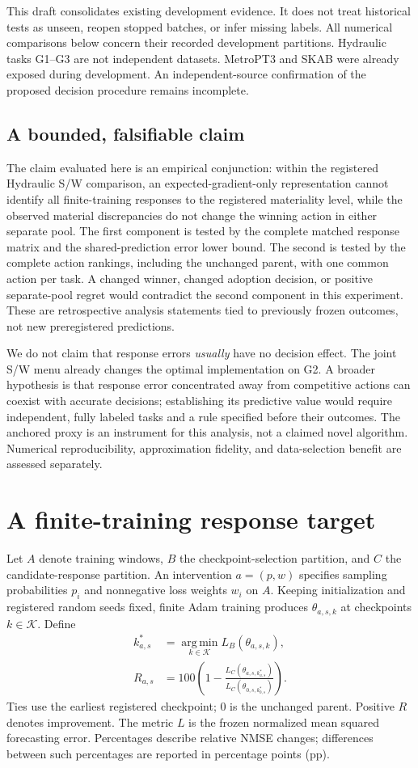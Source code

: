\documentclass[11pt]{article}
\begin{document}
This draft consolidates existing development evidence. It does not treat historical tests as unseen, reopen stopped batches, or infer missing labels. All numerical comparisons below concern their recorded development partitions. Hydraulic tasks G1--G3 are not independent datasets. MetroPT3 and SKAB were already exposed during development. An independent-source confirmation of the proposed decision procedure remains incomplete.

\subsection{A bounded, falsifiable claim}
The claim evaluated here is an empirical conjunction: within the registered Hydraulic S/W comparison, an expected-gradient-only representation cannot identify all finite-training responses to the registered materiality level, while the observed material discrepancies do not change the winning action in either separate pool. The first component is tested by the complete matched response matrix and the shared-prediction error lower bound. The second is tested by the complete action rankings, including the unchanged parent, with one common action per task. A changed winner, changed adoption decision, or positive separate-pool regret would contradict the second component in this experiment. These are retrospective analysis statements tied to previously frozen outcomes, not new preregistered predictions.

We do not claim that response errors \emph{usually} have no decision effect. The joint S/W menu already changes the optimal implementation on G2. A broader hypothesis is that response error concentrated away from competitive actions can coexist with accurate decisions; establishing its predictive value would require independent, fully labeled tasks and a rule specified before their outcomes. The anchored proxy is an instrument for this analysis, not a claimed novel algorithm. Numerical reproducibility, approximation fidelity, and data-selection benefit are assessed separately.

\section{A finite-training response target}
Let $A$ denote training windows, $B$ the checkpoint-selection partition, and $C$ the candidate-response partition. An intervention $a=(p,w)$ specifies sampling probabilities $p_i$ and nonnegative loss weights $w_i$ on $A$. Keeping initialization and registered random seeds fixed, finite Adam training produces $\theta_{a,s,k}$ at checkpoints $k\in\mathcal K$. Define
\begin{align}
 k^*_{a,s}&=\operatorname*{arg\,min}_{k\in\mathcal K}L_B(\theta_{a,s,k}),\\
 R_{a,s}&=100\left(1-\frac{L_C(\theta_{a,s,k^*_{a,s}})}{L_C(\theta_{0,s,k^*_{0,s}})}\right).
\end{align}
Ties use the earliest registered checkpoint; $0$ is the unchanged parent. Positive $R$ denotes improvement. The metric $L$ is the frozen normalized mean squared forecasting error. Percentages describe relative NMSE changes; differences between such percentages are reported in percentage points (pp).
\end{document}

